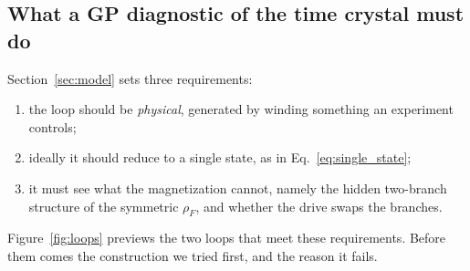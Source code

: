 \documentclass[11pt,a4paper]{article}
\begin{document}
\subsection{What a GP diagnostic of the time crystal must do}

Section~\ref{sec:model} sets three requirements:
\begin{enumerate}[label=(\roman*)]
\item the loop should be \emph{physical}, generated by winding something an experiment controls;
\item ideally it should reduce to a single state, as in Eq.~\eqref{eq:single_state};
\item it must see what the magnetization cannot, namely the hidden two-branch structure of the
  symmetric $\rho_F$, and whether the drive swaps the branches.
\end{enumerate}
Figure~\ref{fig:loops} previews the two loops that meet these requirements. Before them comes
the construction we tried first, and the reason it fails.
\end{document}
